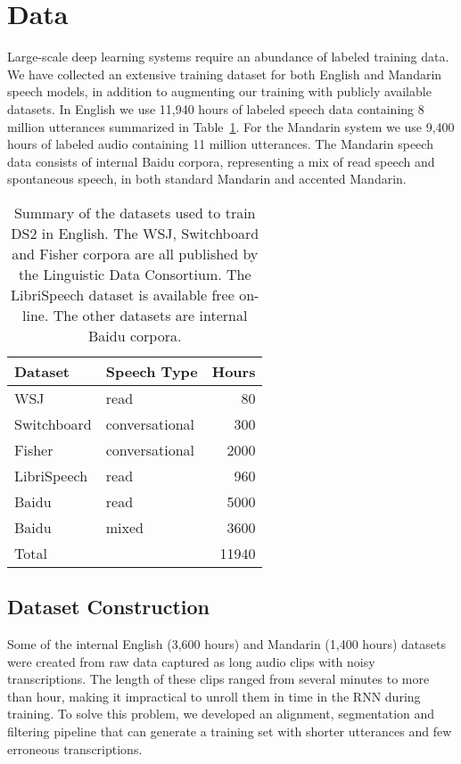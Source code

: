\section{Data}
\label{sec:deepspeech2:data}

Large-scale deep learning systems require an abundance of labeled training
data. We have collected an extensive training dataset for both English and
Mandarin speech models, in addition to augmenting our training with publicly
available datasets. In English we use 11,940 hours of labeled speech data
containing 8 million utterances summarized in
Table~\ref{table:deepspeech2:englishdata}.  For the Mandarin system we use
9,400 hours of labeled audio containing 11 million utterances. The Mandarin
speech data consists of internal Baidu corpora, representing a mix of read
speech and spontaneous speech, in both standard Mandarin and accented Mandarin.

\begin{table}
\centering
\begin{tabular}{l l r}
 \toprule
 Dataset & Speech Type & Hours \\
 \midrule
 WSJ          & read           &   80  \\
 Switchboard  & conversational &  300  \\
 Fisher       & conversational & 2000  \\
 LibriSpeech  & read           &  960  \\
 Baidu        & read           & 5000  \\
 Baidu        & mixed          & 3600  \\
 \midrule
 Total       &                &  11940 \\
 \bottomrule
\end{tabular}
\caption{Summary of the datasets used to train DS2 in English. The WSJ,
    Switchboard and Fisher corpora are all published by the Linguistic Data
    Consortium. The LibriSpeech dataset is available free on-line. The other
    datasets are internal Baidu corpora.}
\label{table:deepspeech2:englishdata}
\end{table}


\subsection{Dataset Construction}

Some of the internal English (3,600 hours) and Mandarin (1,400 hours) datasets
were created from raw data captured as long audio clips with noisy
transcriptions. The length of these clips ranged from several minutes to more
than hour, making it impractical to unroll them in time in the RNN during
training. To solve this problem, we developed an alignment, segmentation and
filtering pipeline that can generate a training set with shorter utterances and
few erroneous transcriptions.

